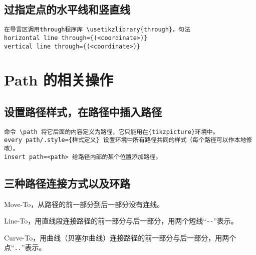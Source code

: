 \documentclass[UTF8]{ctexart}
\begin{document}
\subsection{过指定点的水平线和竖直线 }

\begin{lstlisting}
在导言区调用through程序库 \usetikzlibrary{through}，句法
horizontal line through={(<coordinate>)}
vertical line through={(<coordinate>)}
\end{lstlisting}




\section{Path 的相关操作}

\subsection{设置路径样式，在路径中插入路径}

\begin{lstlisting}
命令 \path 将它后面的内容定义为路径，它只能用在{tikzpicture}环境中。
every path/.style={样式定义} 设置环境中所有路径共同的样式（每个路径可以作本地修改）。
insert path=<path> 给路径内部的某个位置添加路径。
\end{lstlisting}




\subsection{三种路径连接方式以及环路}

Move-To，从路径的前一部分到后一部分没有连线。

Line-To，用直线段连接路径的前一部分与后一部分，用两个短线“\verb!--!”表示。

Curve-To，用曲线（贝塞尔曲线）连接路径的前一部分与后一部分，用两个点“\verb!..!”表示。
\end{document}
